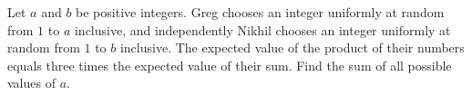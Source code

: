 Let $a$ and $b$ be positive integers. Greg chooses an integer uniformly at random from $1$ to $a$ inclusive, and independently Nikhil chooses an integer uniformly at random from $1$ to $b$ inclusive. The expected value of the product of their numbers equals three times the expected value of their sum. Find the sum of all possible values of $a$.
